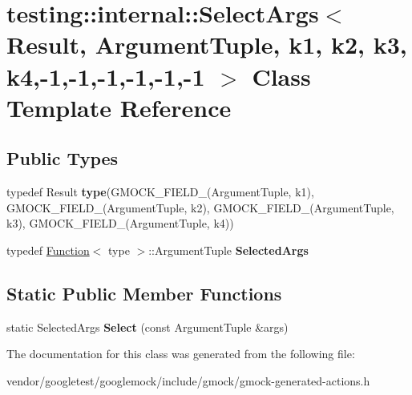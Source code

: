 \hypertarget{classtesting_1_1internal_1_1SelectArgs_3_01Result_00_01ArgumentTuple_00_01k1_00_01k2_00_01k3_00_164a629d34739a5312e400f464e1fa29}{}\section{testing\+:\+:internal\+:\+:Select\+Args$<$ Result, Argument\+Tuple, k1, k2, k3, k4,-\/1,-\/1,-\/1,-\/1,-\/1,-\/1 $>$ Class Template Reference}
\label{classtesting_1_1internal_1_1SelectArgs_3_01Result_00_01ArgumentTuple_00_01k1_00_01k2_00_01k3_00_164a629d34739a5312e400f464e1fa29}
\subsection*{Public Types}
\begin{DoxyCompactItemize}
\item 
typedef Result {\bfseries type}(G\+M\+O\+C\+K\+\_\+\+F\+I\+E\+L\+D\+\_\+(Argument\+Tuple, k1), G\+M\+O\+C\+K\+\_\+\+F\+I\+E\+L\+D\+\_\+(Argument\+Tuple, k2), G\+M\+O\+C\+K\+\_\+\+F\+I\+E\+L\+D\+\_\+(Argument\+Tuple, k3), G\+M\+O\+C\+K\+\_\+\+F\+I\+E\+L\+D\+\_\+(Argument\+Tuple, k4))\hypertarget{classtesting_1_1internal_1_1SelectArgs_3_01Result_00_01ArgumentTuple_00_01k1_00_01k2_00_01k3_00_164a629d34739a5312e400f464e1fa29_ab3943ec249f6a4830eca541202529ec3}{}\label{classtesting_1_1internal_1_1SelectArgs_3_01Result_00_01ArgumentTuple_00_01k1_00_01k2_00_01k3_00_164a629d34739a5312e400f464e1fa29_ab3943ec249f6a4830eca541202529ec3}

\item 
typedef \hyperlink{structtesting_1_1internal_1_1Function}{Function}$<$ type $>$\+::Argument\+Tuple {\bfseries Selected\+Args}\hypertarget{classtesting_1_1internal_1_1SelectArgs_3_01Result_00_01ArgumentTuple_00_01k1_00_01k2_00_01k3_00_164a629d34739a5312e400f464e1fa29_abe7050ab51f411bf8f15dd672b91d3be}{}\label{classtesting_1_1internal_1_1SelectArgs_3_01Result_00_01ArgumentTuple_00_01k1_00_01k2_00_01k3_00_164a629d34739a5312e400f464e1fa29_abe7050ab51f411bf8f15dd672b91d3be}

\end{DoxyCompactItemize}
\subsection*{Static Public Member Functions}
\begin{DoxyCompactItemize}
\item 
static Selected\+Args {\bfseries Select} (const Argument\+Tuple \&args)\hypertarget{classtesting_1_1internal_1_1SelectArgs_3_01Result_00_01ArgumentTuple_00_01k1_00_01k2_00_01k3_00_164a629d34739a5312e400f464e1fa29_a5ce36de7c221508d21378540c8e08523}{}\label{classtesting_1_1internal_1_1SelectArgs_3_01Result_00_01ArgumentTuple_00_01k1_00_01k2_00_01k3_00_164a629d34739a5312e400f464e1fa29_a5ce36de7c221508d21378540c8e08523}

\end{DoxyCompactItemize}


The documentation for this class was generated from the following file\+:\begin{DoxyCompactItemize}
\item 
vendor/googletest/googlemock/include/gmock/gmock-\/generated-\/actions.\+h\end{DoxyCompactItemize}

